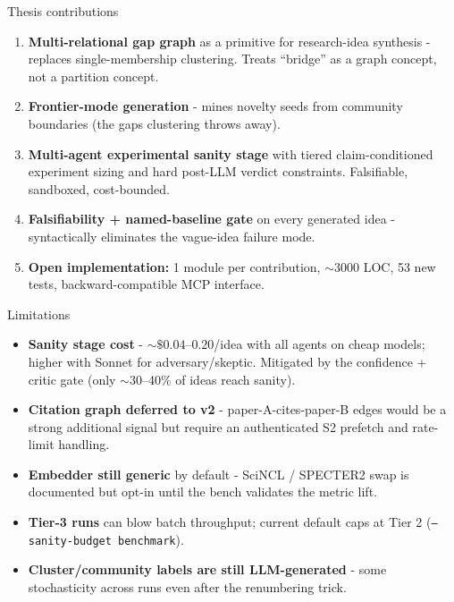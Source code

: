\documentclass[10pt,aspectratio=169]{beamer}
\newcommand{\flag}[1]{\texttt{\small#1}}
\begin{document}
\begin{frame}{Thesis contributions}
  \begin{enumerate}
    \item \textbf{Multi-relational gap graph} as a primitive for research-idea
      synthesis - replaces single-membership clustering. Treats ``bridge''
      as a graph concept, not a partition concept.
    \item \textbf{Frontier-mode generation} - mines novelty seeds from
      community boundaries (the gaps clustering throws away).
    \item \textbf{Multi-agent experimental sanity stage} with tiered
      claim-conditioned experiment sizing and hard post-LLM verdict
      constraints. Falsifiable, sandboxed, cost-bounded.
    \item \textbf{Falsifiability + named-baseline gate} on every generated
      idea - syntactically eliminates the vague-idea failure mode.
    \item \textbf{Open implementation:} 1 module per contribution, $\sim$3000 LOC,
      53 new tests, backward-compatible MCP interface.
  \end{enumerate}
\end{frame}

\begin{frame}{Limitations}
  \begin{itemize}
    \item \textbf{Sanity stage cost} - $\sim\$0.04$--$0.20$/idea with all
      agents on cheap models; higher with Sonnet for adversary/skeptic.
      Mitigated by the confidence + critic gate (only $\sim$30--40\% of ideas
      reach sanity).
    \item \textbf{Citation graph deferred to v2} - paper-A-cites-paper-B
      edges would be a strong additional signal but require an
      authenticated S2 prefetch and rate-limit handling.
    \item \textbf{Embedder still generic} by default - SciNCL / SPECTER2
      swap is documented but opt-in until the bench validates the metric lift.
    \item \textbf{Tier-3 runs} can blow batch throughput; current default
      caps at Tier 2 (\flag{--sanity-budget benchmark}).
    \item \textbf{Cluster/community labels are still LLM-generated} - some
      stochasticity across runs even after the renumbering trick.
  \end{itemize}
\end{frame}
\end{document}
